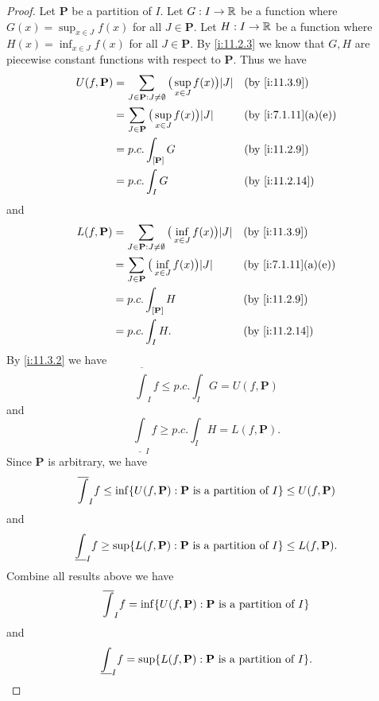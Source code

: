 \begin{proof}
  Let \(\mathbf{P}\) be a partition of \(I\).
  Let \(G : I \to \mathbb{R}\) be a function where \(G(x) = \sup_{x \in J} f(x)\) for all \(J \in \mathbf{P}\).
  Let \(H : I \to \mathbb{R}\) be a function where \(H(x) = \inf_{x \in J} f(x)\) for all \(J \in \mathbf{P}\).
  By \cref{i:11.2.3} we know that \(G, H\) are piecewise constant functions with respect to \(\mathbf{P}\).
  Thus we have
  \begin{align*}
    U(f, \mathbf{P}) & = \sum_{J \in \mathbf{P} : J \neq \emptyset} \big(\sup_{x \in J} f(x)\big) \abs{J} &  & \by{i:11.3.9}      \\
                     & = \sum_{J \in \mathbf{P}} \big(\sup_{x \in J} f(x)\big) \abs{J}                    &  & \by{i:7.1.11}[a,e] \\
                     & = p.c. \int_{[\mathbf{P}]} G                                                       &  & \by{i:11.2.9}      \\
                     & = p.c. \int_I G                                                                    &  & \by{i:11.2.14}
  \end{align*}
  and
  \begin{align*}
    L(f, \mathbf{P}) & = \sum_{J \in \mathbf{P} : J \neq \emptyset} \big(\inf_{x \in J} f(x)\big) \abs{J} &  & \by{i:11.3.9}      \\
                     & = \sum_{J \in \mathbf{P}} \big(\inf_{x \in J} f(x)\big) \abs{J}                    &  & \by{i:7.1.11}[a,e] \\
                     & = p.c. \int_{[\mathbf{P}]} H                                                       &  & \by{i:11.2.9}      \\
                     & = p.c. \int_I H.                                                                   &  & \by{i:11.2.14}
  \end{align*}
  By \cref{i:11.3.2} we have
  \[
    \overline{\int}_I f \leq p.c. \int_I G = U(f, \mathbf{P})
  \]
  and
  \[
    \underline{\int}_I f \geq p.c. \int_I H = L(f, \mathbf{P}).
  \]
  Since \(\mathbf{P}\) is arbitrary, we have
  \[
    \overline{\int}_I f \leq \inf\set{U(f, \mathbf{P}) : \mathbf{P} \text{ is a partition of } I} \leq U(f, \mathbf{P})
  \]
  and
  \[
    \underline{\int}_I f \geq \sup\set{L(f, \mathbf{P}) : \mathbf{P} \text{ is a partition of } I} \leq L(f, \mathbf{P}).
  \]
  Combine all results above we have
  \[
    \overline{\int}_I f = \inf\set{U(f, \mathbf{P}) : \mathbf{P} \text{ is a partition of } I}
  \]
  and
  \[
    \underline{\int}_I f = \sup\set{L(f, \mathbf{P}) : \mathbf{P} \text{ is a partition of } I}.
  \]
\end{proof}


